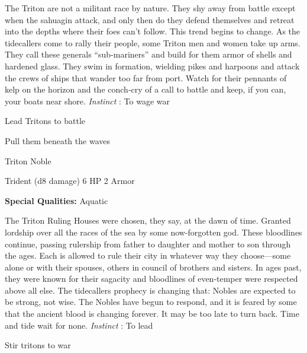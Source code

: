 \startMonsterDescription
The Triton are not a militant race by nature. They shy away from battle except when the sahuagin attack, and only then do they defend themselves and retreat into the depths where their foes can’t follow. This trend begins to change. As the tidecallers come to rally their people, some Triton men and women take up arms. They call these generals “sub-mariners” and build for them armor of shells and hardened glass. They swim in formation, wielding pikes and harpoons and attack the crews of ships that wander too far from port. Watch for their pennants of kelp on the horizon and the conch-cry of a call to battle and keep, if you can, your boats near shore. {\em Instinct} : To wage war
\stopMonsterDescription
       
\startitemize[1,packed]
         
\item Lead Tritons to battle

         
\item Pull them beneath the waves

       
\stopitemize
       
\startMonsterName
Triton Noble	 
\stopMonsterName
       

Trident (d8 damage)	6 HP	2 Armor

       


       
\startMonsterQualities
         {\bf Special Qualities:}  Aquatic
\stopMonsterQualities
       
\startMonsterDescription
The Triton Ruling Houses were chosen, they say, at the dawn of time. Granted lordship over all the races of the sea by some now-forgotten god. These bloodlines continue, passing rulership from father to daughter and mother to son through the ages. Each is allowed to rule their city in whatever way they choose—some alone or with their spouses, others in council of brothers and sisters. In ages past, they were known for their sagacity and bloodlines of even-temper were respected above all else. The tidecallers prophecy is changing that: Nobles are expected to be strong, not wise. The Nobles have begun to respond, and it is feared by some that the ancient blood is changing forever. It may be too late to turn back. Time and tide wait for none. {\em Instinct} : To lead
\stopMonsterDescription
       
\startitemize[1,packed]
         
\item Stir tritons to war

